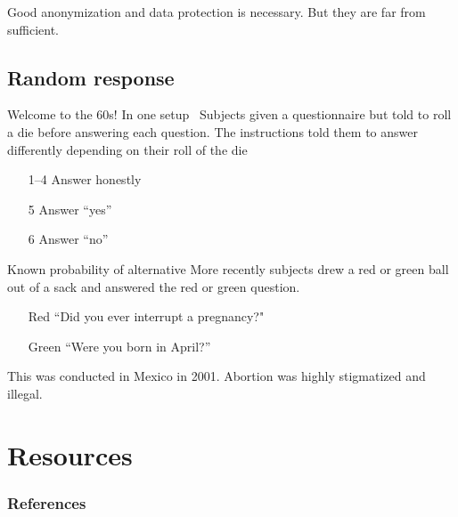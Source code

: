 \documentclass[xcolor={dvipsnames,table,hyperref}]{beamer}
\begin{document}
\begin{frame}[standout]
  Good anonymization and data protection is necessary. But they are far from sufficient.
\end{frame}

\subsection{Random response}

\begin{frame}{Welcome to the 60s!}
  In one setup~\cite{BBB:JoP79} Subjects given a questionnaire but told to roll a die before answering each question.
  The instructions told them to answer differently depending on their roll of the die
  \begin{itemize}
    \item[1--4] Answer honestly
    \item[5] Answer “yes”
    \item[6] Answer “no”
  \end{itemize}
\end{frame}

\begin{frame}{Known probability of alternative}
  More recently subjects drew a red or green ball out of a sack and answered the red or green question. \cite{LaraETAL06:RRT}
  \begin{itemize}
    \item[Red] “Did you ever interrupt a pregnancy?"
    \item[Green] “Were you born in April?”
  \end{itemize}
  This was conducted in Mexico in 2001. Abortion was highly stigmatized and illegal.
\end{frame}

\appendix
\section{Resources}


\begin{frame}[t,allowframebreaks]
  \frametitle{References}
  \printbibliography[heading=none]
\end{frame}

\end{document}

